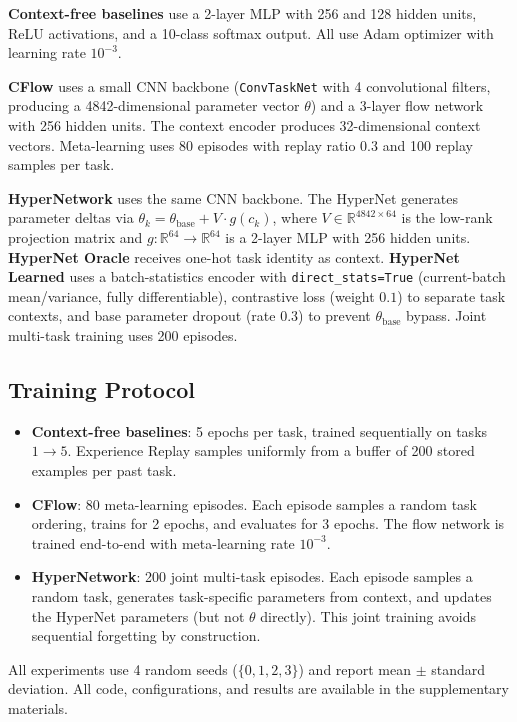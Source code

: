 \documentclass{article}
\begin{document}
\textbf{Context-free baselines} use a 2-layer MLP with 256 and 128 hidden units, ReLU activations, and a 10-class softmax output. All use Adam optimizer with learning rate $10^{-3}$.

\textbf{CFlow} uses a small CNN backbone (\texttt{ConvTaskNet} with 4 convolutional filters, producing a 4842-dimensional parameter vector $\theta$) and a 3-layer flow network with 256 hidden units. The context encoder produces 32-dimensional context vectors. Meta-learning uses 80 episodes with replay ratio $0.3$ and 100 replay samples per task.

\textbf{HyperNetwork} uses the same CNN backbone. The HyperNet generates parameter deltas via $\theta_k = \theta_\mathrm{base} + V \cdot g(c_k)$, where $V \in \mathbb{R}^{4842 \times 64}$ is the low-rank projection matrix and $g: \mathbb{R}^{64} \to \mathbb{R}^{64}$ is a 2-layer MLP with 256 hidden units. \textbf{HyperNet Oracle} receives one-hot task identity as context. \textbf{HyperNet Learned} uses a batch-statistics encoder with \texttt{direct\_stats=True} (current-batch mean/variance, fully differentiable), contrastive loss (weight $0.1$) to separate task contexts, and base parameter dropout (rate $0.3$) to prevent $\theta_\mathrm{base}$ bypass. Joint multi-task training uses 200 episodes.

\subsection{Training Protocol}

\begin{itemize}
    \item \textbf{Context-free baselines}: 5 epochs per task, trained sequentially on tasks $1 \to 5$. Experience Replay samples uniformly from a buffer of 200 stored examples per past task.
    \item \textbf{CFlow}: 80 meta-learning episodes. Each episode samples a random task ordering, trains for 2 epochs, and evaluates for 3 epochs. The flow network is trained end-to-end with meta-learning rate $10^{-3}$.
    \item \textbf{HyperNetwork}: 200 joint multi-task episodes. Each episode samples a random task, generates task-specific parameters from context, and updates the HyperNet parameters (but not $\theta$ directly). This joint training avoids sequential forgetting by construction.
\end{itemize}

All experiments use 4 random seeds ($\{0, 1, 2, 3\}$) and report mean $\pm$ standard deviation. All code, configurations, and results are available in the supplementary materials.
\end{document}
